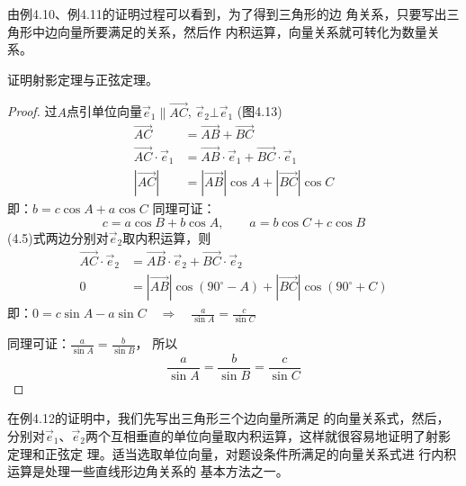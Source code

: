 由例4.10、例4.11的证明过程可以看到，为了得到三角形的边
角关系，只要写出三角形中边向量所要满足的关系，然后作
内积运算，向量关系就可转化为数量关系。



\begin{example}
    证明射影定理与正弦定理。
\end{example}

\begin{proof}
过$A$点引单位向量$\vec{e}_1\parallel \Vec{AC}$, $\vec{e}_2
\bot \vec{e}_1$ (图4.13)
\begin{equation}
    \begin{split}
    \Vec{AC}&=\Vec{AB}+\Vec{BC}\\
    \Vec{AC}\cdot \vec{e}_1&=\Vec{AB}\cdot \vec{e}_1+\Vec{BC}\cdot \vec{e}_1\\
    |\Vec{AC}|&=|\Vec{AB}|\cos A+|\Vec{BC}|\cos C
\end{split}
\end{equation}
即：$b=c\cos A+a\cos C$
同理可证：
\[c=a\cos B+b\cos A,\qquad a=b\cos C+c\cos B\]
(4.5)式两边分别对$\vec{e}_2$取内积运算，则
\[\begin{split}
    \Vec{AC}\cdot \vec{e}_2&=\Vec{AB}\cdot \vec{e}_2+\Vec{BC}\cdot \vec{e}_2\\
    0&=|\Vec{AB}|\cos(90^{\circ}-A)+| \Vec{BC} |\cos(90^{\circ}+C)
\end{split}\]
即：$0=c\sin A-a\sin C\quad \Rightarrow\quad \frac{a}{\sin A}=\frac{c}{\sin C}$

同理可证：$\frac{a}{\sin A}=\frac{b}{\sin B}$，
所以
\[\frac{a}{\sin A}=\frac{b}{\sin B}=\frac{c}{\sin C}\]
\end{proof}

在例4.12的证明中，我们先写出三角形三个边向量所满足
的向量关系式，然后，分别对$\vec{e}_1$、$\vec{e}_2$两个互相垂直的单位向量取内积运算，这样就很容易地证明了射影定理和正弦定
理。适当选取单位向量，对题设条件所满足的向量关系式进
行内积运算是处理一些直线形边角关系的
基本方法之一。

